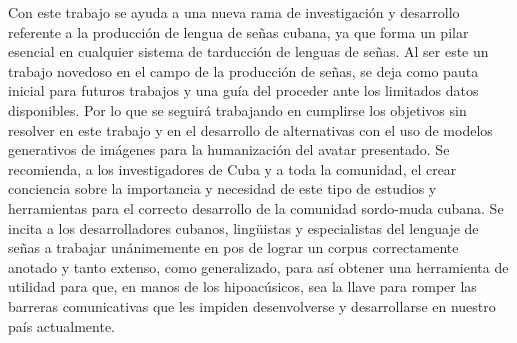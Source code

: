 \begin{recomendations}
    Con este trabajo se ayuda a una nueva rama de investigación y desarrollo referente a la producción de lengua de señas cubana, ya que forma un pilar esencial en cualquier sistema de tarducción de lenguas de señas. 
    Al ser este un trabajo novedoso en el campo de la producción de señas, se deja como pauta inicial para futuros trabajos y una guía del proceder ante los limitados datos disponibles. Por lo que se seguirá trabajando en cumplirse los objetivos sin resolver en este trabajo y en el desarrollo de alternativas con el uso de modelos generativos de imágenes para la humanización del avatar presentado.
   Se recomienda, a los investigadores de Cuba y a toda la comunidad, el crear conciencia sobre la importancia y necesidad de este tipo de estudios y herramientas para el correcto desarrollo de la comunidad sordo-muda cubana.
   Se incita a los desarrolladores cubanos, lingüistas y especialistas del lenguaje de señas a trabajar unánimemente en pos de lograr un corpus correctamente anotado y tanto extenso, como generalizado, para así obtener una herramienta de utilidad para que, en manos de los hipoacúsicos, sea la llave para romper las barreras comunicativas que les impiden desenvolverse y desarrollarse en nuestro país actualmente. 
\end{recomendations}
